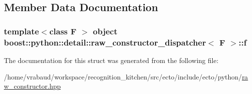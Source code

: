 \subsection{Member Data Documentation}
\subsubsection[{\texorpdfstring{f}{f}}]{\setlength{\rightskip}{0pt plus 5cm}template$<$class F $>$ object {\bf boost\+::python\+::detail\+::raw\+\_\+constructor\+\_\+dispatcher}$<$ F $>$\+::f\hspace{0.3cm}{\ttfamily [private]}}\hypertarget{structboost_1_1python_1_1detail_1_1raw__constructor__dispatcher_a055de51d7e8492c050508aa131ec1dd5}{}\label{structboost_1_1python_1_1detail_1_1raw__constructor__dispatcher_a055de51d7e8492c050508aa131ec1dd5}


The documentation for this struct was generated from the following file\+:\begin{DoxyCompactItemize}
\item 
/home/vrabaud/workspace/recognition\+\_\+kitchen/src/ecto/include/ecto/python/\hyperlink{raw__constructor_8hpp}{raw\+\_\+constructor.\+hpp}\end{DoxyCompactItemize}
